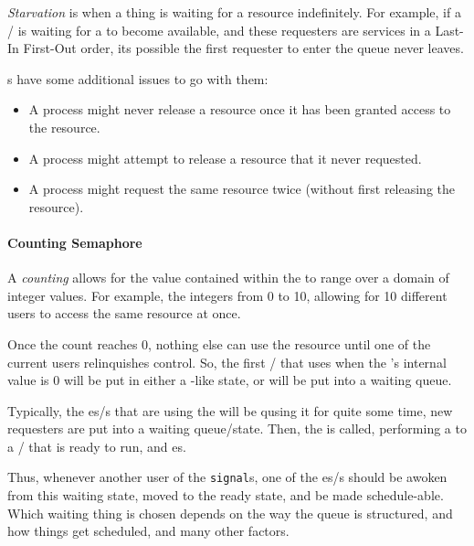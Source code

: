 \begin{definition}[Starvation]\label{def:Starvation}
  \emph{Starvation} is when a thing is waiting for a resource indefinitely.
  For example, if a / is waiting for a  to become available, and these requesters are services in a Last-In First-Out order, its possible the first requester to enter the queue never leaves.
\end{definition}

s have some additional issues to go with them:
\begin{itemize}[noitemsep]
\item A process might never release a resource once it has been granted access to the resource.
\item A process might attempt to release a resource that it never requested.
\item A process might request the same resource twice (without first releasing the resource).
\end{itemize}

\paragraph{Counting Semaphore}\label{par:Counting_Semaphore}
A \emph{counting } allows for the value contained within the  to range over a domain of integer values.
For example, the integers from 0 to 10, allowing for 10 different users to access the same resource at once.

Once the  count reaches 0, nothing else can use the resource until one of the current users relinquishes control.
So, the first / that uses  when the 's internal value is 0 will be put in either a -like state, or will be put into a waiting queue.

Typically, the es/s that are using the  will be qusing it for quite some time, new requesters are put into a waiting queue/state.
Then, the  is called, performing a  to a / that is ready to run, and es.

Thus, whenever another user of the  \texttt{signal}s, one of the es/s should be awoken from this waiting state, moved to the ready state, and be made schedule-able.
Which waiting thing is chosen depends on the way the queue is structured, and how things get scheduled, and many other factors.

